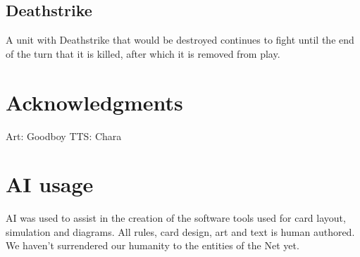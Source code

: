 \documentclass[a4paper, twocolumn]{article}
\begin{document}
\subsection{Deathstrike}
A unit with Deathstrike that would be destroyed continues to fight until the end of the turn that it is killed, after which it is removed from play.


\section{Acknowledgments}
Art: Goodboy
TTS: Chara

\section{AI usage}
AI was used to assist in the creation of the software tools used for card layout, simulation  and diagrams.
All rules, card design, art and text is human authored. We haven't surrendered our humanity to the 
entities of the Net yet.


\newenvironment{qreflist}
  {\begin{itemize}
     \setlength{\topsep}{1pt}\setlength{\partopsep}{0pt}%
     \setlength{\itemsep}{1pt}\setlength{\parsep}{0pt}%
     \setlength{\leftmargin}{1.25em}}
  {\end{itemize}}
\newcommand{\qhead}[1]{\vspace{5pt}{\large\bfseries #1}\par\nobreak\vspace{1pt}%
  {\color{black!45}\hrule height 0.7pt}\vspace{4pt}}
\newcommand{\qshield}[3]{\node at (#1,#2){\resizebox{0.42cm}{!}{%
  \begin{tikzpicture}\blockshield{0}{0}{#3}\end{tikzpicture}}};}

\normalsize
\setlength{\parindent}{0pt}
\renewcommand{\labelitemii}{\textopenbullet}
\end{document}
